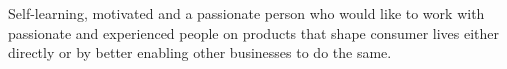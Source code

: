 
\begin{cvparagraph}

Self-learning, motivated and a passionate person who would like to work with
passionate and experienced people on products that shape consumer lives either
directly or by better enabling other businesses to do the same.
\end{cvparagraph}
